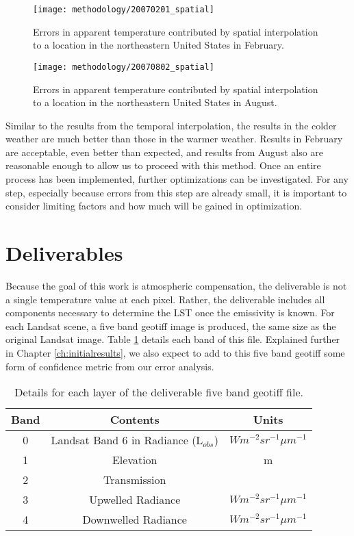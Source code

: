 \documentclass{book}
\begin{document}
\begin{figure}[H]
\centering
\texttt{[image: methodology/20070201\_spatial]}
\caption{Errors in apparent temperature contributed by spatial interpolation to a location in the northeastern United States in February.}
\label{fig:20070201_spatial}
\end{figure}

\begin{figure}[H]
\centering
\texttt{[image: methodology/20070802\_spatial]}
\caption{Errors in apparent temperature contributed by spatial interpolation to a location in the northeastern United States in August.}
\label{fig:20070802_spatial}
\end{figure}

Similar to the results from the temporal interpolation, the results in the colder weather are much better than those in the warmer weather.  Results in February are acceptable, even better than expected, and results from August also are reasonable enough to allow us to proceed with this method.  Once an entire process has been implemented, further optimizations can be investigated.  For any step, especially because errors from this step are already small, it is important to consider limiting factors and how much will be gained in optimization.

\section{Deliverables}
\label{sec:deliverables}

Because the goal of this work is atmospheric compensation, the deliverable is not a single temperature value at each pixel.  Rather, the deliverable includes all components necessary to determine the LST once the emissivity is known.  For each Landsat scene, a five band geotiff image is produced, the same size as the original Landsat image.  Table \ref{tab:deliverables} details each band of this file.  Explained further in Chapter \ref{ch:initialresults}, we also expect to add to this five band geotiff some form of confidence metric from our error analysis.

\begin{table}[H]
\begin{center}
\begin{tabular}{|c | c | c |}
\hline
Band & Contents & Units \\ \hline
0 & Landsat Band 6 in Radiance (L$_{obs}$)  & $Wm^{-2}sr^{-1}{\mu}m^{-1}$ \\ \hline
1 & Elevation & m \\ \hline
2 & Transmission &  \\ \hline
3 & Upwelled Radiance & $Wm^{-2}sr^{-1}{\mu}m^{-1}$ \\ \hline
4 & Downwelled Radiance & $Wm^{-2}sr^{-1}{\mu}m^{-1}$ \\ \hline
\end{tabular}
\caption{Details for each layer of the deliverable five band geotiff file.}
\label{tab:deliverables}
\end{center}
\end{table}
\end{document}
